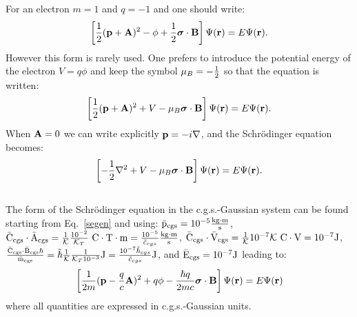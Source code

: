 \documentclass[12pt,a4paper,twoside]{report}
\begin{document}
{{For an electron 
$m=1$ and $q=-1$ and one should write:
\begin{equation}
\left[{1\over 2} ({\bf p}+ {\bf A})^2  
- \phi + {1 \over 2} 
{\boldsymbol \sigma} \cdot {\bf B} \right]
\Psi({\bf r})= E \Psi({\bf r}).
\end{equation}
However this form is rarely used. One prefers to introduce the potential
energy of the electron $V=q\phi$ and keep the symbol $\mu_B=-{1\over 2}$ 
so that the equation is written:
\begin{equation}
\left[{1\over 2} ({\bf p}+ {\bf A})^2  
+ V - \mu_B {\boldsymbol \sigma} \cdot {\bf B} \right]
\Psi({\bf r})= E \Psi({\bf r}).
\end{equation}
When ${\bf A}=0$ we can write explicitly ${\bf p}=-i \nabla$, and
the Schr\"odinger equation becomes:
\begin{equation}
\left[-{1\over 2} \nabla^2  
+ V - \mu_B {\boldsymbol \sigma} \cdot {\bf B} \right]
\Psi({\bf r})= E \Psi({\bf r}).
\end{equation}
}
\\
{\color{orange} The form of the Schr\"odinger equation in the c.g.s.-Gaussian
system can be found starting from Eq.~\ref{segen} and using:
${\rm \bar p_{cgs}}=10^{-5} {{\rm kg}\cdot {\rm m} \over {\rm s}}$, ${\rm \bar C_{cgs}}\cdot {\rm \bar A_{cgs}}=
{1\over \mathcal{K}} {10^{-2}\over \mathcal{K}_T}\ {\rm C}\cdot {\rm T}\cdot {\rm m} = {10^{-5} \over \tilde c_{cgs}}
{{\rm kg}\cdot {\rm m} \over {\rm s}}$, ${\rm \bar C_{cgs}}\cdot {\rm \bar V_{cgs}}= {1\over \mathcal{K}} 10^{-7} \mathcal{K}\  
{\rm C}\cdot {\rm V}= 10^{-7} {\rm J}$, ${{\rm \bar C_{cgs}} \cdot {\rm \bar B_{cgs}} \hbar \over {\rm \bar m_{cgs}}}
= \tilde \hbar {1\over \mathcal{K}} {1\over \mathcal{K}_T 10^{-3}} {\rm J}={10^{-7} \tilde \hbar_{cgs}
\over \tilde c_{cgs}} {\rm J}$, and ${\rm \bar E_{cgs}}=10^{-7} {\rm J}$ leading to:
\begin{equation}
\left[{1\over 2m} ({\bf p}- {q \over c} {\bf A})^2 + 
q \phi - 
{\hbar q \over 2 m c} 
{\boldsymbol \sigma} \cdot {\bf B} \right]
\Psi({\bf r})= E \Psi({\bf r})
\end{equation}
where all quantities are expressed in c.g.s.-Gaussian units.
}

\newpage
\appendix

}
\end{document}
